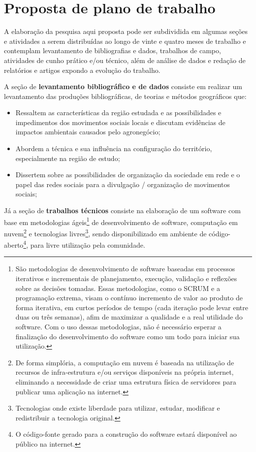 \section{Proposta de plano de trabalho}

A elaboração da pesquisa aqui proposta pode ser subdividida em algumas seções e atividades a serem distribuídas ao longo de vinte e quatro meses de trabalho e contemplam levantamento de bibliografias e dados, trabalhos de campo, atividades de cunho prático e/ou técnico, além de análise de dados e redação de relatórios e artigos expondo a evolução do trabalho.

A seção de \textbf{levantamento bibliográfico e de dados} consiste em realizar um levantamento das produções bibliográficas, de teorias e métodos geográficos que:


\begin{itemize}
 \item Ressaltem as características da região estudada e as possibilidades e impedimentos dos movimentos sociais locais e discutam evidências de impactos ambientais causados pelo agronegócio;
 \item Abordem a técnica e sua influência na configuração do território, especialmente na região de estudo;
 \item Dissertem sobre as possibilidades de organização da sociedade em rede e o papel das redes sociais para a divulgação / organização de movimentos sociais;
\end{itemize}

Já a seção de \textbf{trabalhos técnicos} consiste na elaboração de um software com base em metodologias ágeis\footnote{São metodologias de desenvolvimento de software baseadas em processos iterativos e incrementais de planejamento, execução, validação e reflexões sobre as decisões tomadas. Essas metodologias, como o SCRUM e a programação extrema, visam o contínuo incremento de valor ao produto de forma iterativa, em curtos períodos de tempo (cada iteração pode levar entre duas ou três semanas), afim de maximizar a qualidade e a real utilidade do software. Com o uso dessas metodologias, não é necessário esperar a finalização do desenvolvimento do software como um todo para iniciar sua utilização.} de desenvolvimento de software, computação em nuvem\footnote{De forma simplória, a computação em nuvem é baseada na utilização de recursos de infra-estrutura e/ou serviços disponíveis na própria internet, eliminando a necessidade de criar uma estrutura física de servidores para publicar uma aplicação na internet.} e tecnologias livres\footnote{Tecnologias onde existe liberdade para utilizar, estudar, modificar e redistribuir a tecnologia original.}, sendo disponibilizado em ambiente de código-aberto\footnote{O código-fonte gerado para a construção do software estará disponível ao público na internet.}, para livre utilização pela comunidade.

